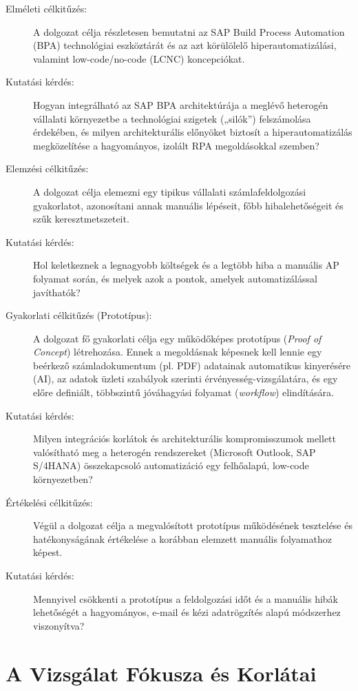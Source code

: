 \begin{description}
    \item[Elméleti célkitűzés:] A dolgozat célja részletesen bemutatni az SAP Build Process Automation (BPA) technológiai eszköztárát és az azt körülölelő hiperautomatizálási, valamint low-code/no-code (LCNC) koncepciókat.
    \item[Kutatási kérdés:] Hogyan integrálható az SAP BPA architektúrája a meglévő heterogén vállalati környezetbe a technológiai szigetek („silók”) felszámolása érdekében, és milyen architekturális előnyöket biztosít a hiperautomatizálás megközelítése a hagyományos, izolált RPA megoldásokkal szemben?
    \item[Elemzési célkitűzés:] A dolgozat célja elemezni egy tipikus vállalati számlafeldolgozási gyakorlatot, azonosítani annak manuális lépéseit, főbb hibalehetőségeit és szűk keresztmetszeteit.
    \item[Kutatási kérdés:] Hol keletkeznek a legnagyobb költségek és a legtöbb hiba a manuális AP folyamat során, és melyek azok a pontok, amelyek automatizálással javíthatók?
    \item[Gyakorlati célkitűzés (Prototípus):] A dolgozat fő gyakorlati célja egy működőképes prototípus (\textit{Proof of Concept}) létrehozása.
    Ennek a megoldásnak képesnek kell lennie egy beérkező számladokumentum (pl. PDF) adatainak automatikus kinyerésére (AI), az adatok üzleti szabályok szerinti érvényesség-vizsgálatára, és egy előre definiált, többszintű jóváhagyási folyamat (\textit{workflow}) elindítására.
    \item[Kutatási kérdés:] Milyen integrációs korlátok és architekturális kompromisszumok mellett valósítható meg a heterogén rendszereket (Microsoft Outlook, SAP S/4HANA) összekapcsoló automatizáció egy felhőalapú, low-code környezetben?
    \item[Értékelési célkitűzés:] Végül a dolgozat célja a megvalósított prototípus működésének tesztelése és hatékonyságának értékelése a korábban elemzett manuális folyamathoz képest.
    \item[Kutatási kérdés:] Mennyivel csökkenti a prototípus a feldolgozási időt és a manuális hibák lehetőségét a hagyományos, e-mail és kézi adatrögzítés alapú módszerhez viszonyítva?
\end{description}


\section{A Vizsgálat Fókusza és Korlátai}
\label{sec:fokusz_korlatok}


